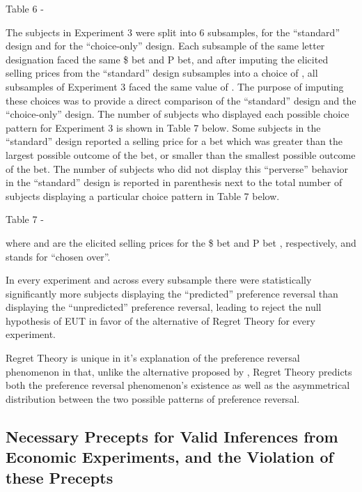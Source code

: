 Table 6 - \textcite{Loomes1989}

The subjects in Experiment 3 were split into 6 subsamples,  for the \enquote{standard} design and  for the \enquote{choice-only} design.
Each subsample of the same letter designation faced the same \$ bet and P bet, and after imputing the elicited selling prices from the \enquote{standard} design subsamples into a choice of , all subsamples of Experiment 3 faced the same value of .
The purpose of imputing these choices was to provide a direct comparison of the \enquote{standard} design and the  \enquote{choice-only} design.
The number of subjects who displayed each possible choice pattern for Experiment 3 is shown in Table 7 below.
Some subjects in the \enquote{standard} design reported a selling price for a bet which was greater than the largest possible outcome of the bet, or smaller than the smallest possible outcome of the bet.
The number of subjects who did not display this \enquote{perverse} behavior in the \enquote{standard} design is reported in parenthesis next to the total number of subjects displaying a particular choice pattern in Table 7 below.


Table 7 - \textcite{Loomes1989}


where  and  are the elicited selling prices for the \$ bet and P bet , respectively, and  stands for \enquote{chosen over}.

In every experiment and across every subsample there were statistically significantly more subjects displaying the \enquote{predicted} preference reversal than displaying the \enquote{unpredicted} preference reversal, leading \textcite{Loomes1989} to reject the null hypothesis of EUT in favor of the alternative of Regret Theory for every experiment.

Regret Theory is unique in it's explanation of the preference reversal phenomenon in that, unlike the alternative proposed by \textcite{Karni1987}, Regret Theory predicts both the preference reversal phenomenon's existence as well as the asymmetrical distribution between the two possible patterns of preference reversal. 


\subsection{Necessary Precepts for Valid Inferences from Economic Experiments, and the Violation of these Precepts}

